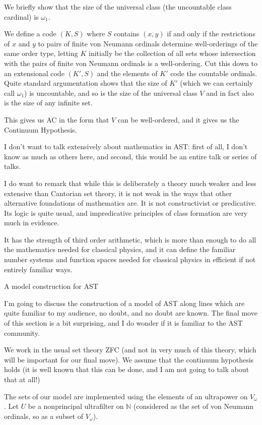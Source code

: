 \documentclass{slides}
\begin{document}
\begin{slide}

We briefly show that the size of the universal class (the uncountable class cardinal) is $\omega_1$.

We define a code $(K,S)$ where $S$ contains $(x,y)$ if and only if the restrictions of $x$ and $y$ to pairs of finite von Neumann ordinals determine well-orderings of the same order type, letting $K$ initially be the collection of all sets whose intersection with the pairs of finite von Neumann ordinals is a well-ordering.  Cut this down to an extensional code $(K',S)$ and the elements of $K'$ code the countable ordinals.  Quite standard argumentation shows that the size of $K'$ (which we can certainly call $\omega_1$) is uncountable, and so is the size of the universal class $V$ and in fact also is the size of any infinite set.

This gives us AC in the form that $V$ can be well-ordered, and it gives us the Continuum Hypothesis.

\end{slide}

\begin{slide}

I don't want to talk extensively about mathematics in AST:  first of all, I don't know as much as others here, and second, this would be an entire talk or series of talks.

I do want to remark that while this is deliberately a theory much weaker and less extensive than Cantorian set theory, it is not weak in the ways that other alternative foundations of mathematics are.  It is not constructivist or predicative.  Its logic is quite usual, and impredicative principles of class formation are very much in evidence.

It has the strength of third order arithmetic, which is more than enough to do all the mathematics needed for classical physics, and it can define the familiar number systems and function spaces needed for classical physics in efficient if not entirely familiar ways.

\end{slide}

\begin{slide}

{\Large A model construction for AST}

I'm going to discuss the construction of a model of AST along lines which are quite familiar to my audience, no doubt, and no doubt are known.  The final move of this section is a bit surprising, and I do wonder if it is familiar to the AST community.

We work in the usual set theory ZFC (and not in very much of this theory, which will be important for our final move).
We assume that the continuum hypothesis holds (it is well known that this can be done, and I am not going to talk about that at all!)

The sets of our model are implemented using the elements of an ultrapower on $V_\omega$.  Let $U$ be a nonprincipal ultrafilter on $\mathbb N$ (considered as the set of von Neumann ordinals, so as a subset of $V_\omega$).

\end{slide}
\end{document}
